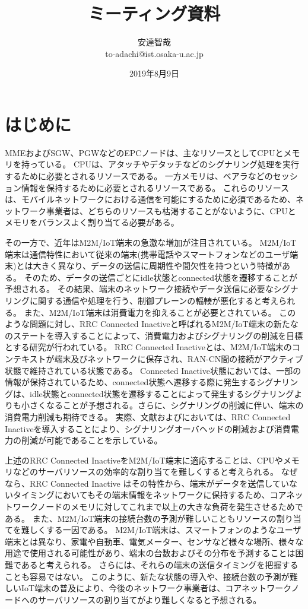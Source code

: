 \documentclass[a4j]{ujarticle}
\title{ミーティング資料}
\author{安達智哉\\to-adachi@ist.osaka-u.ac.jp}
\date{2019年8月9日}
\begin{document}
\maketitle


\section{はじめに}
  \label{sec:abs}
MMEおよびSGW、PGWなどのEPCノードは、主なリソースとしてCPUとメモリを持っている。
CPUは、アタッチやデタッチなどのシグナリング処理を実行するために必要とされるリソースである。
一方メモリは、ベアラなどのセッション情報を保持するために必要とされるリソースである。
これらのリソースは、モバイルネットワークにおける通信を可能にするために必須であるため、ネットワーク事業者は、どちらのリソースも枯渇することがないように、CPUとメモリをバランスよく割り当てる必要がある。

その一方で、近年はM2M/IoT端末の急激な増加が注目されている。
M2M/IoT端末は通信特性において従来の端末(携帯電話やスマートフォンなどのユーザ端末)とは大きく異なり、データの送信に周期性や間欠性を持つという特徴がある。
そのため、データの送信ごとにidle状態とconnected状態を遷移することが予想される。
その結果、端末のネットワーク接続やデータ送信に必要なシグナリングに関する通信や処理を行う、制御プレーンの輻輳が悪化すると考えられる。
また、M2M/IoT端末は消費電力を抑えることが必要とされている。
このような問題に対し、RRC Connected Inactiveと呼ばれるM2M/IoT端末の新たなのステートを導入することによって、消費電力およびシグナリングの削減を目標とする研究が行われている。
RRC Connected Inactiveとは、M2M/IoT端末のコンテキストが端末及びネットワークに保存され、RAN-CN間の接続がアクティブ状態で維持されている状態である。
Connected Inactive状態においては、一部の情報が保持されているため、connected状態へ遷移する際に発生するシグナリングは、idle状態とconnected状態を遷移することによって発生するシグナリングよりも小さくなることが予想される。さらに、シグナリングの削減に伴い、端末の消費電力削減も期待できる。
実際、文献\cite{RRCStateHandlingfor5G}および\cite{ANovelStateModelfor5GRadioAccessNetworks}においては、RRC Connected Inactiveを導入することにより、シグナリングオーバヘッドの削減および消費電力の削減が可能であることを示している。

上述のRRC Connected InactiveをM2M/IoT端末に適応することは、CPUやメモリなどのサーバリソースの効率的な割り当てを難しくすると考えられる。
なぜなら、RRC Connected Inactive	はその特性から、端末がデータを送信していないタイミングにおいてもその端末情報をネットワークに保持するため、コアネットワークノードのメモリに対してこれまで以上の大きな負荷を発生させるためである。
また、M2M/IoT端末の接続台数の予測が難しいこともリソースの割り当てを難しくする一因である。
M2M/IoT端末は、スマートフォンのようなユーザ端末とは異なり、家電や自動車、電気メーター、センサなど様々な場所、様々な用途で使用される可能性があり、端末の台数およびその分布を予測することは困難であると考えられる。
さらには、それらの端末の送信タイミングを把握することも容易ではない。
このように、新たな状態の導入や、接続台数の予測が難しいIoT端末の普及により、今後のネットワーク事業者は、コアネットワークノードへのサーバリソースの割り当てがより難しくなると予想される。
\end{document}
